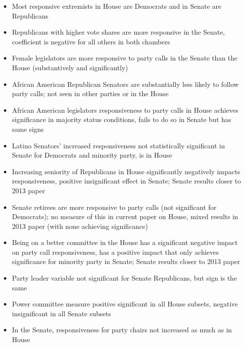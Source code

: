 \documentclass[12pt]{article}
\begin{document}
\begin{itemize}
	\item Most responsive extremists in House are Democrats and in Senate are Republicans
	
	\item Republicans with higher vote shares are more responsive in the Senate, coefficient is negative for all others in both chambers
	
	\item Female legislators are more responsive to party calls in the Senate than the House (substantively and significantly)
	
	\item African American Republican Senators are substantially less likely to follow party calls; not seen in other parties or in the House
	
	\item African American legislators responsiveness to party calls in House achieves significance in majority status conditions, fails to do so in Senate but has same signs
	
	\item Latino Senators' increased responsiveness not statistically significant in Senate for Democrats and minority party, is in House
	
	\item Increasing seniority of Republicans in House significantly negatively impacts responsiveness, positive insignificant effect in Senate; Senate results closer to 2013 paper
	
	\item Senate retirees are more responsive to party calls (not significant for Democrats); no measure of this in current paper on House, mixed results in 2013 paper (with none achieving significance)
	
	\item Being on a better committee in the House has a significant negative impact on party call responsiveness, has a positive impact that only achieves significance for minority party in Senate;
	Senate results closer to 2013 paper
	
	\item Party leader variable not significant for Senate Republicans, but sign is the same
	
	\item Power committee measure positive significant in all House subsets, negative insignificant in all Senate subsets
	
	\item In the Senate, responsiveness for party chairs not increased as much as in House
\end{itemize}
\end{document}
